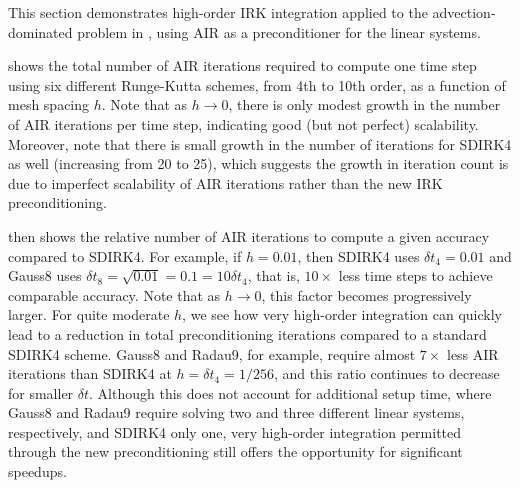 \documentclass[a4paper,10pt]{article}
\begin{document}
This section demonstrates high-order IRK integration applied to the advection-dominated
problem in , using AIR as a preconditioner for the linear
systems.

 shows the total number of AIR iterations required to
compute one time step using six different Runge-Kutta schemes, from 4th
to 10th order, as a function of mesh spacing $h$. Note that as $h\to 0$,
there is only modest growth in the number of AIR iterations per time step,
indicating good (but not perfect) scalability.
Moreover, note that there is small growth in the number of iterations for
SDIRK4 as well (increasing from 20 to 25), which suggests the growth in
iteration count is due to imperfect scalability of AIR iterations rather
than the new IRK preconditioning.

 then shows the relative number of AIR iterations to
compute a given accuracy compared to SDIRK4. For example, if $h=0.01$,
then SDIRK4 uses $\delta t_4 = 0.01$ and Gauss8 uses $\delta t_8 =
\sqrt{0.01} = 0.1 = 10\delta t_4$, that is, $10\times$ less time steps to
achieve comparable accuracy. Note that as $h\to 0$, this factor becomes progressively
larger. For quite moderate $h$, we see how very high-order integration
can quickly lead to a reduction in total preconditioning iterations compared to a
standard SDIRK4 scheme. Gauss8 and Radau9, for example, require almost
$7\times$ less AIR iterations than SDIRK4 at $h =\delta t_4 = 1/256$,
and this ratio continues to decrease for smaller $\delta t$. Although this
does not account for additional setup time, where Gauss8 and Radau9 require
solving two and three different linear systems, respectively, and SDIRK4
only one, very high-order
integration permitted through the new preconditioning still offers the
opportunity for significant speedups.
\end{document}
